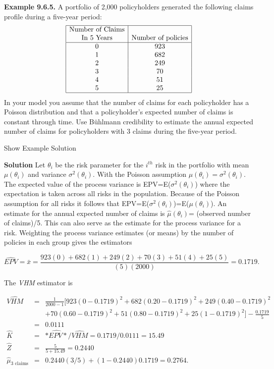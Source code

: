 \documentclass[]{book}
\theoremstyle{definition}
\theoremstyle{definition}
\theoremstyle{definition}
\theoremstyle{remark}
\begin{document}
\textbf{Example 9.6.5.} A portfolio of 2,000 policyholders generated the
following claims profile during a five-year period: \[\begin{matrix}
\begin{array}{|c|c|}
\hline
\text{Number of Claims} &   \\
\text{In 5 Years}           &  \text{Number of policies}\\
\hline
 0 &  923 \\
 1 &  682 \\  
 2 &  249 \\  
 3 &  70   \\
 4 &  51   \\  
 5 &  25   \\     
\hline
\end{array}
\end{matrix}\] In your model you assume that the number of claims for
each policyholder has a Poisson distribution and that a policyholder's
expected number of claims is constant through time. Use Bühlmann
credibility to estimate the annual expected number of claims for
policyholders with 3 claims during the five-year period.

Show Example Solution

\hypertarget{toggleExampleCred.6.5}{}
\textbf{Solution} Let \(\theta_i\) be the risk parameter for the
\(i^{th}\) risk in the portfolio with mean \(\mu(\theta_i)\) and
variance \(\sigma^2(\theta_i)\). With the Poisson assumption
\(\mu(\theta_i)=\sigma^2(\theta_i)\). The expected value of the process
variance is EPV=E(\(\sigma^2(\theta_i)\)) where the expectation is taken
across all risks in the population. Because of the Poisson assumption
for all risks it follows that
EPV=E(\(\sigma^2(\theta_i)\))=E(\(\mu(\theta_i)\)). An estimate for the
annual expected number of claims is \(\hat{\mu}(\theta_i)\)= (observed
number of claims)/5. This can also serve as the estimate for the process
variance for a risk. Weighting the process variance estimates (or means)
by the number of policies in each group gives the estimators

\begin{equation*}  
\widehat{EPV}=\bar{x}=\frac{923(0)+682(1)+249(2)+70(3)+51(4)+25(5)}{(5)(2000)}=0.1719.
\end{equation*}

The \emph{VHM} estimator is

\begin{eqnarray*}
\hat{VHM}&=&\frac{1}{2000-1}[923(0-0.1719)^2+682(0.20-0.1719)^2+249(0.40-0.1719)^2\\
                            &   &+70(0.60-0.1719)^2+51(0.80-0.1719)^2+25(1-0.1719)^2]-\frac{0.1719}{5}\\
                            &=& 0.0111\\
               \hat{K}  &=& \hat{*EPV*}/\hat{VHM}=0.1719/0.0111=15.49\\
               \hat{Z}  &=& \frac{5}{5+15.49}=0.2440\\
               \hat{\mu}_{3 \textrm{ claims}}& = & 0.2440(3/5)+(1-0.2440)0.1719=0.2764 .\\
\end{eqnarray*}
\end{document}
